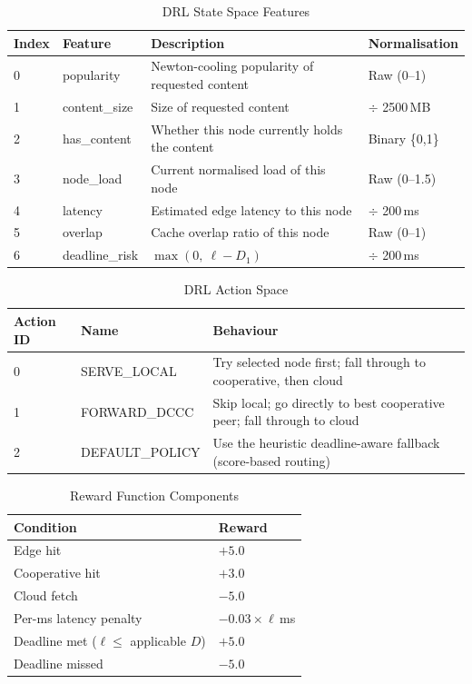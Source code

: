 \documentclass[12pt,a4paper]{report}
\begin{document}
\begin{table}[H]
\centering
\caption{DRL State Space Features}
\label{tab:state}
\renewcommand{\arraystretch}{1.3}
\begin{tabular}{C{1cm} L{3cm} L{6cm} L{3cm}}
\toprule
\textbf{Index} & \textbf{Feature} & \textbf{Description} & \textbf{Normalisation}\\
 & popularity       & Newton-cooling popularity of requested content & Raw (0--1)\\
1 & content\_size    & Size of requested content & $\div$ 2500\,MB\\
2 & has\_content     & Whether this node currently holds the content & Binary \{0,1\}\\
3 & node\_load       & Current normalised load of this node & Raw (0--1.5)\\
4 & latency          & Estimated edge latency to this node & $\div$ 200\,ms\\
5 & overlap          & Cache overlap ratio of this node & Raw (0--1)\\
6 & deadline\_risk   & $\max(0,\ \ell - D_1)$ & $\div$ 200\,ms\\
\bottomrule
\end{tabular}
\end{table}

\begin{table}[H]
\centering
\caption{DRL Action Space}
\label{tab:actions}
\renewcommand{\arraystretch}{1.3}
\begin{tabular}{C{2cm} L{3.5cm} L{8cm}}
\toprule
\textbf{Action ID} & \textbf{Name} & \textbf{Behaviour}\\
 & SERVE\_LOCAL      & Try selected node first; fall through to cooperative, then cloud\\
1 & FORWARD\_DCCC     & Skip local; go directly to best cooperative peer; fall through to cloud\\
2 & DEFAULT\_POLICY   & Use the heuristic deadline-aware fallback (score-based routing)\\
\bottomrule
\end{tabular}
\end{table}

\begin{table}[H]
\centering
\caption{Reward Function Components}
\label{tab:reward}
\renewcommand{\arraystretch}{1.3}
\begin{tabular}{L{7cm} R{4cm}}
\toprule
\textbf{Condition} & \textbf{Reward}\\
\midrule
Edge hit                                  & $+5.0$\\
Cooperative hit                           & $+3.0$\\
Cloud fetch                               & $-5.0$\\
Per-ms latency penalty                    & $-0.03 \times \ell$\,ms\\
Deadline met ($\ell \leq$ applicable $D$) & $+5.0$\\
Deadline missed                           & $-5.0$\\
\bottomrule
\end{tabular}
\end{table}
\end{document}
